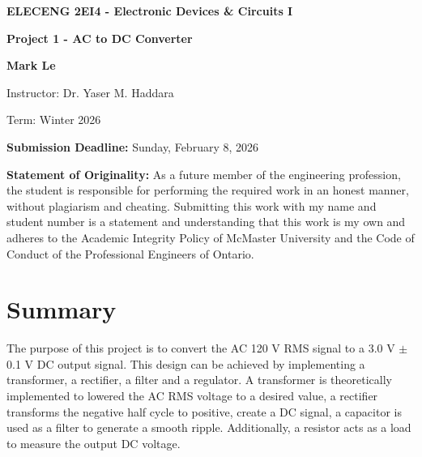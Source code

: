 \documentclass[12pt]{article}
\begin{document}
    
    \begin{titlepage}
    \begin{center}
    \vspace*{\fill}

    {\LARGE \textbf{ELECENG 2EI4 - Electronic Devices \& Circuits I}\par}
    \vspace{2.5cm}

    {\LARGE\bfseries Project 1 - AC to DC Converter\par}
    \vspace{2.5cm}
    
    {\Large \textbf{Mark Le}\par}
    \vspace{2.5cm}
    
    {\large Instructor: Dr. Yaser M. Haddara\par}
    \vspace{0.5cm}
    {\large Term: Winter 2026 \par}
    \vspace{0.5cm}
    
    {\large \textbf{Submission Deadline:} Sunday, February 8, 2026\par}
    \end{center}

    \vspace*{\fill}

    \textbf{Statement of Originality:} As a future member of the engineering profession, the student is responsible for performing the required work in an honest manner, without plagiarism and cheating. Submitting this work with my name and student number is a statement and understanding that this work is my own and adheres to the Academic Integrity Policy of McMaster University and the Code of Conduct of the Professional Engineers of Ontario.

\end{titlepage}

    \newpage
    \tableofcontents

    \listoffigures

    \listoftables

    \newpage
    \section{Summary}

    The purpose of this project is to convert the AC 120 V RMS signal to a 3.0 V \(\pm\) 0.1 V DC output signal. This design can be achieved by implementing a transformer, a rectifier, a filter and a regulator. A transformer is theoretically implemented to lowered the AC RMS voltage to a desired value, a rectifier transforms the negative half cycle to positive, create a DC signal, a capacitor is used as a filter to generate a smooth ripple. Additionally, a resistor acts as a load to measure the output DC voltage.  
    
\end{document}
